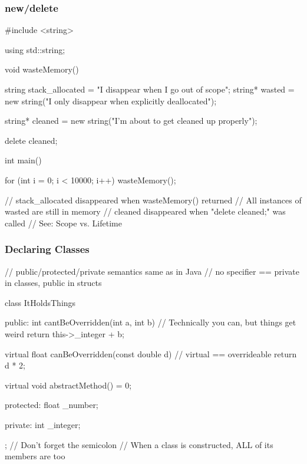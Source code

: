 \documentclass[glossy]{beamer}
\begin{document}
\begin{frame}[fragile=singleslide]
  \frametitle{new/delete}
  \begin{cppcode}
#include <string>

using std::string;

void wasteMemory() {
  string stack_allocated = "I disappear when I go out of scope";
  string* wasted = new string("I only disappear when explicitly deallocated");

  string* cleaned = new string("I'm about to get cleaned up properly");

  delete cleaned;
}

int main() {
  for (int i = 0; i < 10000; i++) {
    wasteMemory();
  }

  // stack_allocated disappeared when wasteMemory() returned
  // All instances of wasted are still in memory
  // cleaned disappeared when "delete cleaned;" was called
  // See: Scope vs. Lifetime
}
  \end{cppcode}
\end{frame}

\begin{frame}[fragile=singleslide]
  \begin{cppcode}


  \end{cppcode}
\end{frame}

\begin{frame}[fragile=singleslide]
  \frametitle{Declaring Classes}
  \begin{cppcode}
// public/protected/private semantics same as in Java
// no specifier == private in classes, public in structs

class ItHoldsThings {
  public: 
    int cantBeOverridden(int a, int b) {
      // Technically you can, but things get weird
      return this->_integer + b;
    }

    virtual float canBeOverridden(const double d) {
      // virtual == overrideable
      return d * 2;
    }

    virtual void abstractMethod() = 0;

  protected:
    float _number;

  private:
    int _integer;
}; // Don't forget the semicolon
// When a class is constructed, ALL of its members are too
  \end{cppcode}
\end{frame}
\end{document}
